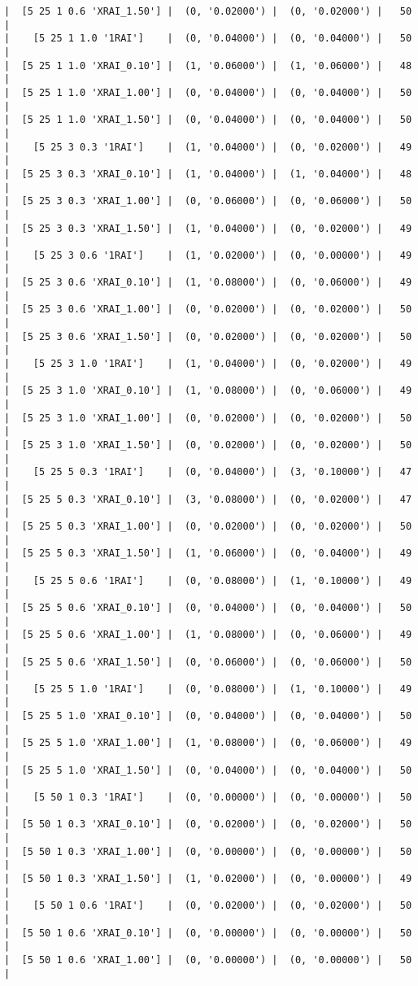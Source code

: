 \documentclass{article}
\begin{document}
\begin{verbatim}
|  [5 25 1 0.6 'XRAI_1.50'] |  (0, '0.02000') |  (0, '0.02000') |   50  |
|    [5 25 1 1.0 '1RAI']    |  (0, '0.04000') |  (0, '0.04000') |   50  |
|  [5 25 1 1.0 'XRAI_0.10'] |  (1, '0.06000') |  (1, '0.06000') |   48  |
|  [5 25 1 1.0 'XRAI_1.00'] |  (0, '0.04000') |  (0, '0.04000') |   50  |
|  [5 25 1 1.0 'XRAI_1.50'] |  (0, '0.04000') |  (0, '0.04000') |   50  |
|    [5 25 3 0.3 '1RAI']    |  (1, '0.04000') |  (0, '0.02000') |   49  |
|  [5 25 3 0.3 'XRAI_0.10'] |  (1, '0.04000') |  (1, '0.04000') |   48  |
|  [5 25 3 0.3 'XRAI_1.00'] |  (0, '0.06000') |  (0, '0.06000') |   50  |
|  [5 25 3 0.3 'XRAI_1.50'] |  (1, '0.04000') |  (0, '0.02000') |   49  |
|    [5 25 3 0.6 '1RAI']    |  (1, '0.02000') |  (0, '0.00000') |   49  |
|  [5 25 3 0.6 'XRAI_0.10'] |  (1, '0.08000') |  (0, '0.06000') |   49  |
|  [5 25 3 0.6 'XRAI_1.00'] |  (0, '0.02000') |  (0, '0.02000') |   50  |
|  [5 25 3 0.6 'XRAI_1.50'] |  (0, '0.02000') |  (0, '0.02000') |   50  |
|    [5 25 3 1.0 '1RAI']    |  (1, '0.04000') |  (0, '0.02000') |   49  |
|  [5 25 3 1.0 'XRAI_0.10'] |  (1, '0.08000') |  (0, '0.06000') |   49  |
|  [5 25 3 1.0 'XRAI_1.00'] |  (0, '0.02000') |  (0, '0.02000') |   50  |
|  [5 25 3 1.0 'XRAI_1.50'] |  (0, '0.02000') |  (0, '0.02000') |   50  |
|    [5 25 5 0.3 '1RAI']    |  (0, '0.04000') |  (3, '0.10000') |   47  |
|  [5 25 5 0.3 'XRAI_0.10'] |  (3, '0.08000') |  (0, '0.02000') |   47  |
|  [5 25 5 0.3 'XRAI_1.00'] |  (0, '0.02000') |  (0, '0.02000') |   50  |
|  [5 25 5 0.3 'XRAI_1.50'] |  (1, '0.06000') |  (0, '0.04000') |   49  |
|    [5 25 5 0.6 '1RAI']    |  (0, '0.08000') |  (1, '0.10000') |   49  |
|  [5 25 5 0.6 'XRAI_0.10'] |  (0, '0.04000') |  (0, '0.04000') |   50  |
|  [5 25 5 0.6 'XRAI_1.00'] |  (1, '0.08000') |  (0, '0.06000') |   49  |
|  [5 25 5 0.6 'XRAI_1.50'] |  (0, '0.06000') |  (0, '0.06000') |   50  |
|    [5 25 5 1.0 '1RAI']    |  (0, '0.08000') |  (1, '0.10000') |   49  |
|  [5 25 5 1.0 'XRAI_0.10'] |  (0, '0.04000') |  (0, '0.04000') |   50  |
|  [5 25 5 1.0 'XRAI_1.00'] |  (1, '0.08000') |  (0, '0.06000') |   49  |
|  [5 25 5 1.0 'XRAI_1.50'] |  (0, '0.04000') |  (0, '0.04000') |   50  |
|    [5 50 1 0.3 '1RAI']    |  (0, '0.00000') |  (0, '0.00000') |   50  |
|  [5 50 1 0.3 'XRAI_0.10'] |  (0, '0.02000') |  (0, '0.02000') |   50  |
|  [5 50 1 0.3 'XRAI_1.00'] |  (0, '0.00000') |  (0, '0.00000') |   50  |
|  [5 50 1 0.3 'XRAI_1.50'] |  (1, '0.02000') |  (0, '0.00000') |   49  |
|    [5 50 1 0.6 '1RAI']    |  (0, '0.02000') |  (0, '0.02000') |   50  |
|  [5 50 1 0.6 'XRAI_0.10'] |  (0, '0.00000') |  (0, '0.00000') |   50  |
|  [5 50 1 0.6 'XRAI_1.00'] |  (0, '0.00000') |  (0, '0.00000') |   50  |

\end{verbatim}
\end{document}
